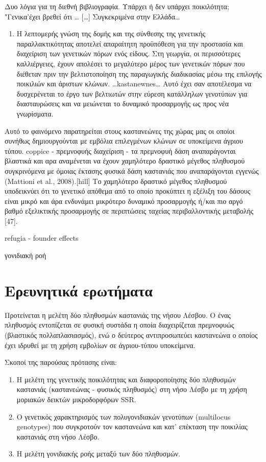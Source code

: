 \documentclass[12pt,a4paper,]{report}
\providecommand{\tightlist}{%
  \setlength{\itemsep}{0pt}\setlength{\parskip}{0pt}}
\begin{document}
Δυο λόγια για τη διεθνή βιβλιογραφία. Υπάρχει ή δεν υπάρχει ποικιλότητα;
"Γενικα'έχει βρεθεί ότι \ldots{} {[}\ldots{}{]} Συγκεκριμένα στην
Ελλάδα\ldots{}

\begin{enumerate}
\def\labelenumi{\arabic{enumi}.}
\tightlist
\item
  Η λεπτομερής γνώση της δομής και της σύνθεσης της γενετικής
  παραλλακτικότητας αποτελεί απαραίτητη προϋπόθεση για την προστασία και
  διαχείριση των γενετικών πόρων ενός είδους. Στη γεωργία, οι
  περισσότερες καλλιέργειες, έχουν απολέσει το μεγαλύτερο μέρος των
  γενετικών πόρων που διέθεταν πριν την βελτιστοποίηση της παραγωγικής
  διαδικασίας μέσω της επιλογής ποικιλιών και άριστων κλώνων.
  \ldots{}kastanewnes\ldots{} Αυτό έχει σαν αποτέλεσμα να δυσχερένεται
  το έργο των βελτιωτών στην εύρεση κατάλληλων γενοτύπων για
  διασταυρώσεις και να μειώνεται το δυναμικό προσαρμογής ως προς νέα
  γνωρίσματα.
\end{enumerate}

Αυτό το φαινόμενο παρατηρείται στους καστανεώνες της χώρας μας οι οποίοι
συνήθως δημιουργούνται με εμβόλια επιλεγμένων κλώνων σε υποκείμενα
άγριου τύπου. coppice - πρεμνοφυής διαχείριση - τα πρεμνοφυή δάση
αναπαράγονται βλαστικά και αρα αναμένεται να έχουν χαμηλότερο δραστικό
μέγεθος πληθυσμού συγκρινόμενα με όμοιας έκτασης φυσικά δάση καστανιάς
που αναπαράγονται εγγενώς (Mattioni et al., 2008).{[}hill{]} Το
χαμηλότερο δραστικό μέγεθος πληθυσμού υποδεικνύει ότι το γενετικό
απόθεμα από το οποίο προκύπτει η εξέλιξη του δάσους είναι μικρό και άρα
ενδυνάμει μικρότερο δυναμικό προσαρμογής ή/και πιο αργό βαθμό
εξελικτικής προσαρμογής σε περιπτώσεις ταχείας περιβαλλοντικής μεταβολής
{[}47{]}.

refugia - founder effects

γονιδιακή ροή

\hypertarget{-}{%
\section{Ερευνητικά ερωτήματα}\label{-}}

Προτείνεται η μελέτη δύο πληθυσμών καστανιάς της νήσου Λέσβου. Ο ένας
πληθυσμός εντοπίζεται σε φυσική συστάδα η οποία διαχειρίζεται πρεμνοφυώς
(βλαστικός πολλαπλασιασμός), ενώ ο δεύτερος αντιπροσωπεύει καστανεώνα ο
οποίος έχει ιδρυθεί με τη χρήση εμβολίων σε άγριου-τύπου υποκείμενα.

Σκοποί της παρούσας πρότασης είναι:

\begin{enumerate}
\def\labelenumi{\arabic{enumi}.}
\item
  Η μελέτη της γενετικής ποικιλότητας και διαφοροποίησης δύο πληθυσμών
  καστανιάς (καστανεώνας - φυσικός πληθυσμός) στη νήσο Λέσβο με τη χρήση
  μοριακών δεικτών μικροδορφόρων SSR.
\item
  Ο γενετικός χαρακτηρισμός των πολυγονιδιακών γενοτύπων (multilocus
  genotypes) που συγκροτούν τον καστανεώνα και κατ' επέκταση την
  ποικιλίας καστανιάς στη νήσο Λέσβο.
\item
  Η μελέτη γονιδιακής ροής μεταξύ των δύο πληθυσμών.
\end{enumerate}
\end{document}
